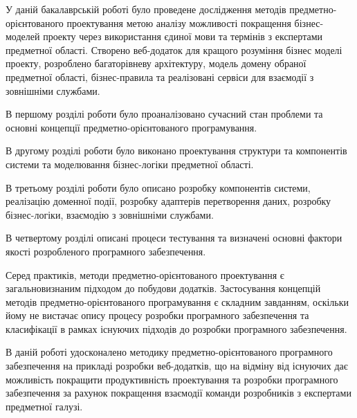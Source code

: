 
У даній бакалаврській роботі було проведене дослідження
методів предметно-орієнтованого проектування метою аналізу
можливості покращення бізнес-моделей проекту через
використання єдиної мови та термінів з експертами предметної
області. Створено веб-додаток для кращого розуміння бізнес
моделі проекту, розроблено багаторівневу архітектуру,
модель домену обраної предметної області, бізнес-правила
та реалізовані сервіси для взаємодії з зовнішніми службами.

В першому розділі роботи було проаналізовано сучасний
стан проблеми та основні концепції предметно-орієнтованого програмування.

В другому розділі роботи було виконано проектування структури
та компонентів системи та моделювання бізнес-логіки предметної області.

В третьому розділі роботи було описано розробку компонентів системи,
реалізацію доменної події, розробку адаптерів перетворення даних,
розробку бізнес-логіки, взаємодію з зовнішніми службами.

В четвертому розділі описані процеси тестування
та визначені основні фактори якості розробленого програмного забезпечення.

Серед практиків, методи предметно-орієнтованого проектування
є загальновизнаним підходом до побудови додатків.
Застосування концепцій методів предметно-орієнтованого
програмування є складним завданням, оскільки йому не
вистачає опису процесу розробки програмного забезпечення
та класифікації в рамках існуючих підходів до розробки програмного забезпечення.

В даній роботі удосконалено методику предметно-орієнтованого
програмного забезпечення на прикладі розробки веб-додатків,
що на відміну від існуючих дає можливість покращити продуктивність
проектування та розробки програмного забезпечення за рахунок
покращення взаємодії команди розробників з експертами предметної галузі.
